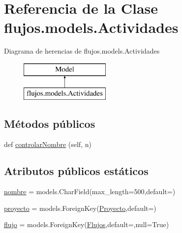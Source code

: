 \hypertarget{classflujos_1_1models_1_1_actividades}{}\section{Referencia de la Clase flujos.\+models.\+Actividades}
\label{classflujos_1_1models_1_1_actividades}
Diagrama de herencias de flujos.\+models.\+Actividades\begin{figure}[H]
\begin{center}
\leavevmode
\includegraphics[height=2.000000cm]{classflujos_1_1models_1_1_actividades}
\end{center}
\end{figure}
\subsection*{Métodos públicos}
\begin{DoxyCompactItemize}
\item 
def \hyperlink{classflujos_1_1models_1_1_actividades_a84860c9edd03a22e6fa1b6ac578d3cd5}{controlar\+Nombre} (self, n)
\end{DoxyCompactItemize}
\subsection*{Atributos públicos estáticos}
\begin{DoxyCompactItemize}
\item 
\hyperlink{classflujos_1_1models_1_1_actividades_aa89000f61f5d28c782f2e203fb8ec5e4}{nombre} = models.\+Char\+Field(max\+\_\+length=500,default=\textquotesingle{}\textquotesingle{})
\item 
\hyperlink{classflujos_1_1models_1_1_actividades_a6a0d8446b89654ce08dd207e9fa0916e}{proyecto} = models.\+Foreign\+Key(\hyperlink{classproyectos_1_1models_1_1_proyecto}{Proyecto},default=\textquotesingle{}\textquotesingle{})
\item 
\hyperlink{classflujos_1_1models_1_1_actividades_a1c4faf8ebd91bf2a12e575c3c96b9d7f}{flujo} = models.\+Foreign\+Key(\hyperlink{classflujos_1_1models_1_1_flujos}{Flujos},default=\textquotesingle{}\textquotesingle{},null=True)
\end{DoxyCompactItemize}


